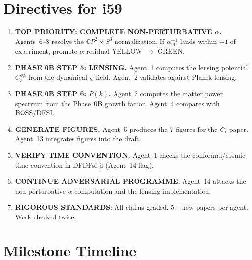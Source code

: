 \documentclass[11pt,a4paper]{article}
\newcommand{\CP}{\mathbb{C}P}
\begin{document}
\section{Directives for i59}
\label{sec:directives}

\begin{enumerate}
\item \textbf{TOP PRIORITY: COMPLETE NON-PERTURBATIVE $\alpha$.} Agents~6--8 resolve the $\CP^2 \times S^3$ normalization. If $\alpha^{-1}_{\mathrm{np}}$ lands within $\pm 1$ of experiment, promote $\alpha$ residual YELLOW $\to$ GREEN.

\item \textbf{PHASE 0B STEP 5: LENSING.} Agent~1 computes the lensing potential $C_\ell^{\phi\phi}$ from the dynamical $\psi$-field. Agent~2 validates against Planck lensing.

\item \textbf{PHASE 0B STEP 6: $P(k)$.} Agent~3 computes the matter power spectrum from the Phase~0B growth factor. Agent~4 compares with BOSS/DESI.

\item \textbf{GENERATE FIGURES.} Agent~5 produces the 7 figures for the $C_\ell$ paper. Agent~13 integrates figures into the draft.

\item \textbf{VERIFY TIME CONVENTION.} Agent~1 checks the conformal/cosmic time convention in DFDPsi.jl (Agent~14 flag).

\item \textbf{CONTINUE ADVERSARIAL PROGRAMME.} Agent~14 attacks the non-perturbative $\alpha$ computation and the lensing implementation.

\item \textbf{RIGOROUS STANDARDS}: All claims graded. 5+ new papers per agent. Work checked twice.
\end{enumerate}


\section{Milestone Timeline}
\label{sec:timeline}
\end{document}
